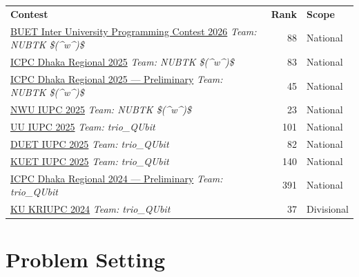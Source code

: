 \documentclass[a4paper,11pt]{article}
\begin{document}
\begin{tabularx}{\textwidth}{X r l}
  \textbf{Contest} & \textbf{Rank} & \textbf{Scope} \\[3pt]
  \href{https://toph.co/c/inter-university-buet-cse-fest-2026/standings}
       {BUET Inter University Programming Contest 2026}
       \hfill \textit{Team: NUBTK \$({\textasciicircum}w{\textasciicircum})\$}
       & 88 & National \\[2pt]
  \href{https://bapsoj.org/contests/icpc-dhaka-onsite-2025/standings}
       {ICPC Dhaka Regional 2025}
       \hfill \textit{Team: NUBTK \$({\textasciicircum}w{\textasciicircum})\$}
       & 83 & National \\[2pt]
  \href{https://bapsoj.org/contests/icpc-dhaka-2025-online-preliminary/standings}
       {ICPC Dhaka Regional 2025 --- Preliminary}
       \hfill \textit{Team: NUBTK \$({\textasciicircum}w{\textasciicircum})\$}
       & 45 & National \\[2pt]
  \href{https://coderoj.com/c/nwu-cse-fest-2025/standings}
       {NWU IUPC 2025}
       \hfill \textit{Team: NUBTK \$({\textasciicircum}w{\textasciicircum})\$}
       & 23 & National \\[2pt]
  \href{https://toph.co/c/uttara-university-inter-university-2025/standings}
       {UU IUPC 2025}
       \hfill \textit{Team: trio\_QUbit}
       & 101 & National \\[2pt]
  \href{https://toph.co/c/duet-inter-university-iupc-2025/standings}
       {DUET IUPC 2025}
       \hfill \textit{Team: trio\_QUbit}
       & 82 & National \\[2pt]
  \href{https://bapsoj.org/contests/miaki-presents-kuet-iupc-onsite-2025/standings}
       {KUET IUPC 2025}
       \hfill \textit{Team: trio\_QUbit}
       & 140 & National \\[2pt]
  \href{https://bapsoj.org/contests/icpc-preliminary-dhaka-site-2024/standings}
       {ICPC Dhaka Regional 2024 --- Preliminary}
       \hfill \textit{Team: trio\_QUbit}
       & 391 & National \\[2pt]
  \href{https://toph.co/c/khulna-regional-inter-university-kriupc/standings}
       {KU KRIUPC 2024}
       \hfill \textit{Team: trio\_QUbit}
       & 37 & Divisional \\
\end{tabularx}

\section{Problem Setting}
\end{document}
